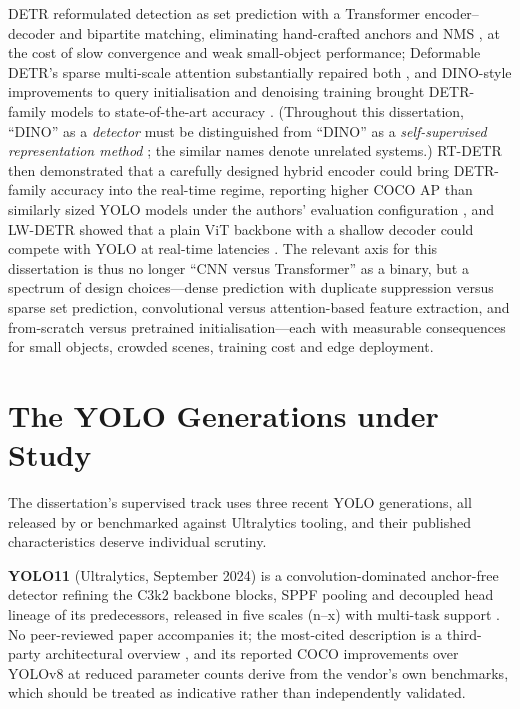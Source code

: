 DETR reformulated detection as set prediction with a Transformer encoder--decoder and bipartite matching, eliminating hand-crafted anchors and NMS \citep{carion2020end}, at the cost of slow convergence and weak small-object performance; Deformable DETR's sparse multi-scale attention substantially repaired both \citep{zhu2021deformable}, and DINO-style improvements to query initialisation and denoising training brought DETR-family models to state-of-the-art accuracy \citep{zhang2023dino}. (Throughout this dissertation, ``DINO'' as a \emph{detector} \citep{zhang2023dino} must be distinguished from ``DINO'' as a \emph{self-supervised representation method} \citep{caron2021emerging}; the similar names denote unrelated systems.) RT-DETR then demonstrated that a carefully designed hybrid encoder could bring DETR-family accuracy into the real-time regime, reporting higher COCO AP than similarly sized YOLO models under the authors' evaluation configuration \citep{zhao2024detrs}, and LW-DETR showed that a plain ViT backbone with a shallow decoder could compete with YOLO at real-time latencies \citep{chen2024lwdetr}. The relevant axis for this dissertation is thus no longer ``CNN versus Transformer'' as a binary, but a spectrum of design choices---dense prediction with duplicate suppression versus sparse set prediction, convolutional versus attention-based feature extraction, and from-scratch versus pretrained initialisation---each with measurable consequences for small objects, crowded scenes, training cost and edge deployment.

\section{The YOLO Generations under Study}
\label{sec:lr-yolo}

The dissertation's supervised track uses three recent YOLO generations, all released by or benchmarked against Ultralytics tooling, and their published characteristics deserve individual scrutiny.

\textbf{YOLO11} (Ultralytics, September 2024) is a convolution-dominated anchor-free detector refining the C3k2 backbone blocks, SPPF pooling and decoupled head lineage of its predecessors, released in five scales (n--x) with multi-task support \citep{ultralytics2024yolo11}. No peer-reviewed paper accompanies it; the most-cited description is a third-party architectural overview \citep{khanam2024yolov11}, and its reported COCO improvements over YOLOv8 at reduced parameter counts derive from the vendor's own benchmarks, which should be treated as indicative rather than independently validated.

